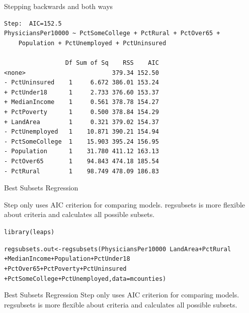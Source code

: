 \documentclass{beamer}\usepackage[]{graphicx}\usepackage[]{color}
\makeatletter
\newcommand{\hlopt}[1]{\textcolor[rgb]{1,0.894,0.769}{#1}}%
\newcommand{\hlstd}[1]{\textcolor[rgb]{1,0.894,0.769}{#1}}%
\newcommand{\hlkwb}[1]{\textcolor[rgb]{0.804,0.776,0.451}{#1}}%
\newcommand{\hlkwc}[1]{\textcolor[rgb]{0.78,0.941,0.545}{#1}}%
\newcommand{\hlkwd}[1]{\textcolor[rgb]{1,0.78,0.769}{#1}}%
\newenvironment{kframe}{%
 \def\at@end@of@kframe{}%
 \ifinner\ifhmode%
  \def\at@end@of@kframe{\end{minipage}}%
  \begin{minipage}{\columnwidth}%
 \fi\fi%
 \def\FrameCommand##1{\hskip\@totalleftmargin \hskip-\fboxsep
 \colorbox{shadecolor}{##1}\hskip-\fboxsep
     \hskip-\linewidth \hskip-\@totalleftmargin \hskip\columnwidth}%
 \MakeFramed {\advance\hsize-\width
   \@totalleftmargin\z@ \linewidth\hsize
   \@setminipage}}%
 {\par\unskip\endMakeFramed%
 \at@end@of@kframe}
\newenvironment{knitrout}{}{} %
\makeatother
\begin{document}
\begin{darkframes}
\begin{frame}[fragile]{Stepping backwards and both ways}
\begin{knitrout}
\begin{kframe}
\begin{verbatim}
Step:  AIC=152.5
PhysiciansPer10000 ~ PctSomeCollege + PctRural + PctOver65 + 
    Population + PctUnemployed + PctUninsured

                 Df Sum of Sq    RSS    AIC
<none>                        379.34 152.50
- PctUninsured    1     6.672 386.01 153.24
+ PctUnder18      1     2.733 376.60 153.37
+ MedianIncome    1     0.561 378.78 154.27
+ PctPoverty      1     0.500 378.84 154.29
+ LandArea        1     0.321 379.02 154.37
- PctUnemployed   1    10.871 390.21 154.94
- PctSomeCollege  1    15.903 395.24 156.95
- Population      1    31.780 411.12 163.13
- PctOver65       1    94.843 474.18 185.54
- PctRural        1    98.749 478.09 186.83
\end{verbatim}
\end{kframe}
\end{knitrout}

      \lc %
    \end{frame}


    \begin{frame}[fragile]{Best Subsets Regression}
     
     Step only uses AIC criterion for comparing models. regsubsets is more flexible about criteria and calculates all possible subsets. 

    \fontsize{8}{8}\selectfont
\begin{knitrout}
\begin{kframe}
\begin{alltt}
\hlkwd{library}\hlstd{(leaps)}

\hlstd{regsubsets.out} \hlkwb{<-} \hlkwd{regsubsets}\hlstd{(PhysiciansPer10000} \hlopt{~} \hlstd{LandArea} \hlopt{+} \hlstd{PctRural}
                             \hlopt{+} \hlstd{MedianIncome} \hlopt{+} \hlstd{Population} \hlopt{+} \hlstd{PctUnder18}
                             \hlopt{+} \hlstd{PctOver65} \hlopt{+} \hlstd{PctPoverty} \hlopt{+} \hlstd{PctUninsured}
                             \hlopt{+} \hlstd{PctSomeCollege} \hlopt{+} \hlstd{PctUnemployed,} \hlkwc{data}\hlstd{=mcounties)}
\end{alltt}
\end{kframe}
\end{knitrout}

    \end{frame}


    \begin{frame}[fragile]{Best Subsets Regression}
    \fontsize{8}{8}\selectfont
     Step only uses AIC criterion for comparing models. regsubsets is more flexible about criteria and calculates all possible subsets. 
      

\end{frame}
\end{darkframes}
\end{document}

